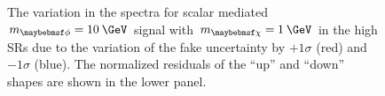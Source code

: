 \begin{figure}[h]
  \centering
  \caption{The variation in the \ptmiss spectra for scalar mediated $\mMed=10\:\GeV$ signal with $\mDM=1\:\GeV$ in the high \mttll SRs due to the variation of the fake \ptmiss uncertainty by $+1\sigma$ (red) and $-1\sigma$ (blue). The normalized residuals of the ``up'' and ``down'' shapes are shown in the lower panel.}
  \label{fig:fakeMETshape}
\end{figure}

